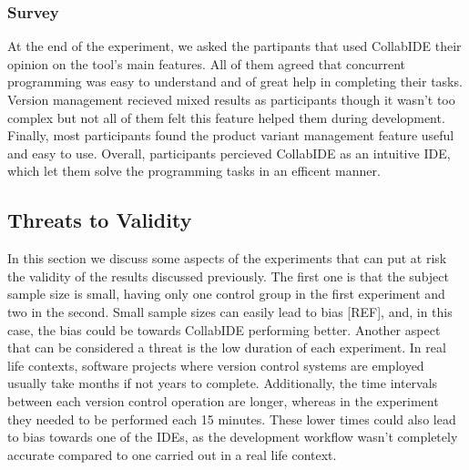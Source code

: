 \subsubsection{Survey}
At the end of the experiment, we asked the partipants that used CollabIDE their opinion on the tool's main features. All of them agreed that concurrent programming was easy to understand and  of great help in completing their tasks. Version management recieved mixed results as participants though it wasn't too complex but not all of them felt this feature helped them during development. Finally, most participants found the product variant management feature useful and easy to use. Overall, participants percieved CollabIDE as an intuitive IDE, which let them solve the programming tasks in an efficent manner. 

\subsection{Threats to Validity}
In this section we discuss some aspects of the experiments that can put at risk the validity of the results discussed previously. The first one is that the subject sample size is small, having only one control group in the first experiment and two in the second. Small sample sizes can easily lead to bias [REF], and, in this case, the bias could be towards CollabIDE performing better. Another aspect that can be considered a threat is the low duration of each experiment. In real life contexts, software projects where version control systems are employed usually take months if not years to complete. Additionally, the time intervals between each version control operation are longer, whereas in the experiment they needed to be performed each 15 minutes. These lower times could also lead to bias towards one of the IDEs, as the development workflow wasn't completely accurate compared to one carried out in a real life context. 


\endinput
